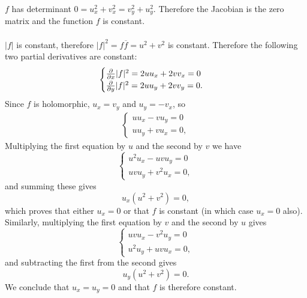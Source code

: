\documentclass[12pt]{article}
\renewcommand{\bar}{\overline}
\begin{document}
\begin{description}
{\begin{description}
{      $f$ has determinant $0 = u_x^2 + v_x^2 = v_y^2 + u_y^2$. Therefore the
      Jacobian
      is the zero matrix and the function $f$ is constant.\\
      ~\\
       $|f|$ is constant, therefore
      $|f|^2 = f\bar f = u^2 + v^2$ is constant. Therefore the following two
      partial derivatives are constant:
      \begin{align*}
        \begin{cases}
          \frac{\partial}{\partial x} |f|^2 =  2uu_x + 2vv_x = 0 \\
          \frac{\partial}{\partial y} |f|^2 = 2uu_y + 2vv_y = 0.
        \end{cases}
      \end{align*}
      Since $f$ is holomorphic, $u_x = v_y$ and $u_y = -v_x$, so
      \begin{align*}
        \begin{cases}
          uu_x - vu_y = 0 \\
          uu_y + vu_x = 0,
        \end{cases}
      \end{align*}
      Multiplying the first equation by $u$ and the second by $v$ we have
      $$
      \begin{cases}
        u^2u_x - uvu_y = 0 \\
        uvu_y + v^2u_x = 0,
      \end{cases}
      $$
      and summing these gives
      $$
      u_x(u^2 + v^2) = 0,
      $$
      which proves that either $u_x = 0$ or that $f$ is constant (in which case $u_x = 0$ also).\\
      Similarly, multiplying the first equation by $v$ and the second by $u$ gives
      $$
      \begin{cases}
        uvu_x - v^2u_y = 0 \\
        u^2u_y + uvu_x = 0,
      \end{cases}
      $$
      and subtracting the first from the second gives
      $$
      u_y(u^2 + v^2) = 0.
      $$
      We conclude that $u_x = u_y = 0$ and that $f$ is therefore constant.  }
     \\\\
    \textnormal{
}
\end{description}}
\end{description}
\end{document}
